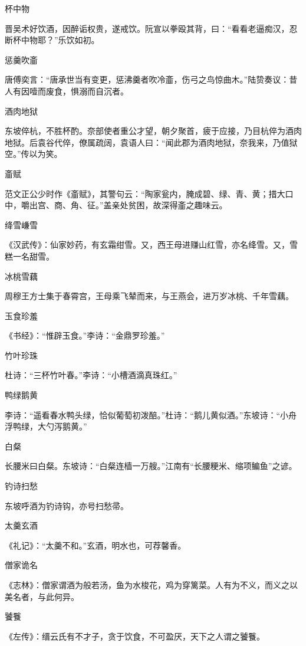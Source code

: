 \documentclass[a4paper,12pt,UTF8,twoside]{ctexbook}
\begin{document}
    杯中物
    
    晋吴术好饮酒，因醉诟权贵，遂戒饮。阮宣以拳殴其背，曰：“看看老逼痴汉，忍断杯中物耶？”乐饮如初。
    
    惩羹吹齑
    
    唐傅奕言：“唐承世当有变更，惩沸羹者吹冷齑，伤弓之鸟惊曲木。”陆贽奏议：昔人有因噎而废食，惧溺而自沉者。
    
    酒肉地狱
    
    东坡倅杭，不胜杯酌。奈部使者重公才望，朝夕聚首，疲于应接，乃目杭倅为酒肉地狱。后袁谷代倅，僚属疏阔，袁语人曰：“闻此郡为酒肉地狱，奈我来，乃值狱空。”传以为笑。
    
    齑赋
    
    范文正公少时作《齑赋》，其警句云：“陶家瓮内，腌成碧、绿、青、黄；措大口中，嚼出宫、商、角、征。”盖亲处贫困，故深得齑之趣味云。
    
    绛雪嵰雪
    
    《汉武传》：仙家妙药，有玄霜绀雪。又，西王母进赚山红雪，亦名绛雪。又，雪糕一名甜雪。
    
    冰桃雪藕
    
    周穆王方士集于春霄宫，王母乘飞辇而来，与王燕会，进万岁冰桃、千年雪藕。
    
    玉食珍羞
    
    《书经》：“惟辟玉食。”李诗：“金鼎罗珍羞。”
    
    竹叶珍珠
    
    杜诗：“三杯竹叶春。”李诗：“小槽酒滴真珠红。”
    
    鸭绿鹅黄
    
    李诗：“遥看春水鸭头绿，恰似葡萄初泼醅。”杜诗：“鹅儿黄似酒。”东坡诗：“小舟浮鸭绿，大勺泻鹅黄。”
    
    白粲
    
    长腰米曰白粲。东坡诗：“白粲连樯一万艘。”江南有“长腰粳米、缩项鳊鱼”之谚。
    
    钓诗扫愁
    
    东坡呼酒为钓诗钩，亦号扫愁帚。
    
    太羹玄酒
    
    《礼记》：“太羹不和。”玄酒，明水也，可荐馨香。
    
    僧家诡名
    
    《志林》：僧家谓酒为般若汤，鱼为水梭花，鸡为穿篱菜。人有为不义，而义之以美名者，与此何异。
    
    饕餮
    
    《左传》：缙云氏有不才子，贪于饮食，不可盈厌，天下之人谓之饕餮。
    
\end{document}

